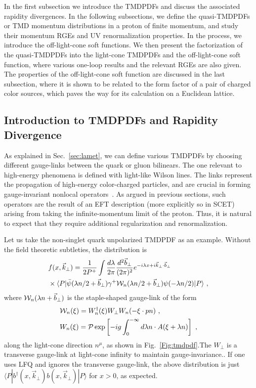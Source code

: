 \documentclass[aps,rmp,reprint,amsmath,amssymb,graphicx,longbibliography]{revtex4-1} %
\newcommand{\nn}{\nonumber}
\DeclareRobustCommand{\sec}[1]{Sec.~\ref{sec:#1}}
\begin{document}
In the first subsection we introduce the TMDPDFs and discuss the associated rapidity divergences. In the following subsections, we define the quasi-TMDPDFs or TMD momentum distributions in a proton of finite momentum,
and study their momentum RGEs and UV renormalization properties. In the process,
we introduce the off-light-cone soft functions. We then present the factorization of the quasi-TMDPDFs into the light-cone TMDPDFs and the off-light-cone soft function, where various one-loop results and the relevant RGEs are also given.
The properties of the off-light-cone soft function are discussed in the last subsection, where it is shown to be related to
the form factor of a pair of charged color sources, which paves the way for its calculation on a Euclidean lattice.

\subsection{Introduction to TMDPDFs and Rapidity Divergence}
\label{sec:lightconetmd}

As explained in \sec{lamet}, we can define various TMDPDFs by choosing different
gauge-links between the quark or gluon bilinears. The one relevant to high-energy phenomena is defined with
light-like Wilson lines. The links represent the propagation of high-energy color-charged particles, and are crucial in forming gauge-invariant nonlocal operators~\cite{Belitsky:2002sm}. As argued in previous sections, such
operators are the result of an EFT description (more explicitly so in SCET) arising from
taking the infinite-momentum limit of the proton. Thus, it is natural to expect that they require additional regularization and renormalization.

Let us take the non-singlet quark unpolarized TMDPDF as an example.
Without the field theoretic subtleties, the distribution is
\begin{align}\label{eq:beam}
	& f(x,\vec{k}_\perp) = \frac{1}{2P^+}\int\frac{d\lambda}{2\pi}\frac{d^2\vec{b}_\perp}{(2\pi)^2}
	e^{-i\lambda x+i\vec{k}_\perp \cdot \vec{b}_\perp}\\
	& \times \langle P| \bar \psi(\lambda n/2 +\vec{b}_\perp)\gamma^+{\cal W}_n(\lambda n/2+\vec{b}_\perp)\psi(-\lambda n/2)|P\rangle  \ ,\nn
\end{align}
where ${\cal W}_n(\lambda n+\vec{b}_\perp)$ is the staple-shaped gauge-link of the form
\begin{align}
	&{\cal W}_n(\xi)=W^{\dagger}_{n}(\xi)W_{\perp}W_{n}(-\xi \cdot p n) \label{eq:staplen} \ , \\
	&W_{n}(\xi)= {\cal P}\exp\left[-ig\int_{0}^{-\infty} d\lambda n\cdot A(\xi+\lambda n)\right] \ ,
\end{align}
along the light-cone direction $n^\mu$, as shown in Fig.~\ref{Fig:tmdpdf}.The $W_\perp$ is a transverse gauge-link at light-cone infinity to maintain gauge-invariance..
If one uses LFQ and ignores the transverse gauge-link, the above distribution
is just $\langle P|b^\dagger (x,\vec{k}_\perp)b(x,\vec{k}_\perp)|P\rangle$ for $x>0$, as expected.
\end{document}
